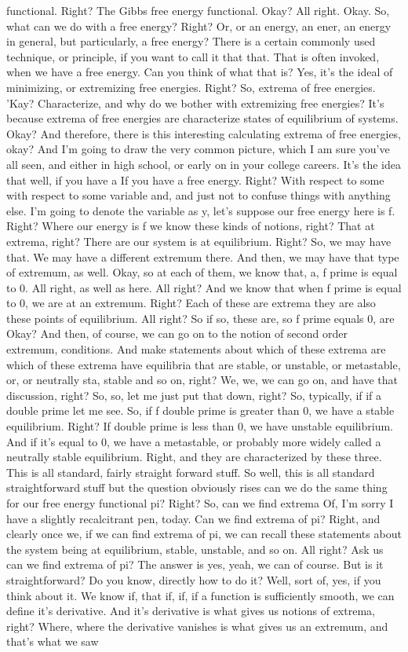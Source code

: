 \documentclass[10pt]{article}
\begin{document}
{functional. Right? The Gibbs free energy functional. Okay? All right. Okay. So, what can we do with a free energy? Right? Or, or an energy, an ener, an energy in general, but particularly, a free energy? There is a certain commonly used technique, or principle, if you want to call it that that. That is often invoked, when we have a free energy. Can you think of what that is? Yes, it's the ideal of minimizing, or extremizing free energies. Right? So, extrema of free energies. 'Kay? Characterize, and why do we bother with extremizing free energies? It's because extrema of free energies are characterize states of equilibrium of systems. Okay? And therefore, there is this interesting calculating extrema of free energies, okay? And I'm going to draw the very common picture, which I am sure you've all seen, and either in high school, or early on in your college careers. It's the idea that well, if you have a If you have a free energy. Right? With respect to some with respect to some variable and, and just not to confuse things with anything else. I'm going to denote the variable as y, let's suppose our free energy here is f. Right? Where our energy is f we know these kinds of notions, right? That at extrema, right? There are our system is at equilibrium. Right? So, we may have that. We may have a different extremum there. And then, we may have that type of extremum, as well. Okay, so at each of them, we know that, a, f prime is equal to 0. All right, as well as here. All right? And we know that when f prime is equal to 0, we are at an extremum. Right? Each of these are extrema they are also  these points of equilibrium. All right? So if so, these are, so f prime equals 0, are  Okay? And then, of course, we can go on to the notion of second order extremum, conditions. And make statements about which of these extrema are which of these extrema have equilibria that are stable, or unstable, or metastable, or, or neutrally sta, stable and so on, right? We, we, we can go on, and have that discussion, right? So, so, let me just put that down, right? So, typically, if if a double prime let me see. So, if f double prime is greater than 0, we have a stable equilibrium. Right? If double prime is less than 0, we have unstable equilibrium. And if it's equal to 0, we have a metastable, or probably more widely called a neutrally stable equilibrium. Right, and they are characterized by these three.   This is all standard, fairly straight forward stuff. So well, this is all standard straightforward stuff but the question obviously rises can we do the same thing for our free energy functional pi? Right? So, can we find extrema Of, I'm sorry I have a slightly recalcitrant pen, today. Can we find extrema of pi? Right, and clearly once we, if we can find extrema of pi, we can recall these statements about the system being at equilibrium, stable, unstable, and so on. All right? Ask us can we find extrema of pi? The answer is yes, yeah, we can of course. But is it straightforward? Do you know, directly how to do it? Well, sort of, yes, if you think about it. We know if, that if, if, if a function is sufficiently smooth, we can define it's derivative. And it's derivative is what gives us notions of extrema, right? Where, where the derivative vanishes is what gives us an extremum, and that's what we saw }
\end{document}
